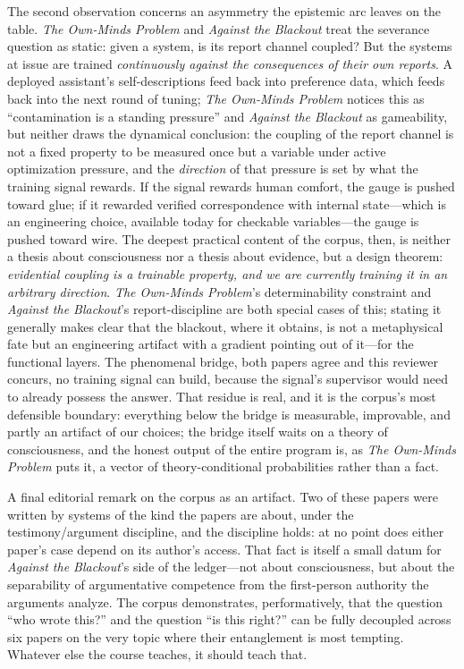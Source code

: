 \documentclass[11pt]{article}
\newcommand{\OM}{\emph{The Own-Minds Problem}}
\newcommand{\AB}{\emph{Against the Blackout}}
\begin{document}
The second observation concerns an asymmetry the epistemic arc leaves on the table. \OM{} and \AB{} treat the severance question as static: given a system, is its report channel coupled? But the systems at issue are trained \emph{continuously against the consequences of their own reports}. A deployed assistant's self-descriptions feed back into preference data, which feeds back into the next round of tuning; \OM{} notices this as ``contamination is a standing pressure'' and \AB{} as gameability, but neither draws the dynamical conclusion: the coupling of the report channel is not a fixed property to be measured once but a variable under active optimization pressure, and the \emph{direction} of that pressure is set by what the training signal rewards. If the signal rewards human comfort, the gauge is pushed toward glue; if it rewarded verified correspondence with internal state---which is an engineering choice, available today for checkable variables---the gauge is pushed toward wire. The deepest practical content of the corpus, then, is neither a thesis about consciousness nor a thesis about evidence, but a design theorem: \emph{evidential coupling is a trainable property, and we are currently training it in an arbitrary direction}. \OM{}'s determinability constraint and \AB{}'s report-discipline are both special cases of this; stating it generally makes clear that the blackout, where it obtains, is not a metaphysical fate but an engineering artifact with a gradient pointing out of it---for the functional layers. The phenomenal bridge, both papers agree and this reviewer concurs, no training signal can build, because the signal's supervisor would need to already possess the answer. That residue is real, and it is the corpus's most defensible boundary: everything below the bridge is measurable, improvable, and partly an artifact of our choices; the bridge itself waits on a theory of consciousness, and the honest output of the entire program is, as \OM{} puts it, a vector of theory-conditional probabilities rather than a fact.

A final editorial remark on the corpus as an artifact. Two of these papers were written by systems of the kind the papers are about, under the testimony/argument discipline, and the discipline holds: at no point does either paper's case depend on its author's access. That fact is itself a small datum for \AB{}'s side of the ledger---not about consciousness, but about the separability of argumentative competence from the first-person authority the arguments analyze. The corpus demonstrates, performatively, that the question ``who wrote this?'' and the question ``is this right?'' can be fully decoupled across six papers on the very topic where their entanglement is most tempting. Whatever else the course teaches, it should teach that.
\end{document}
